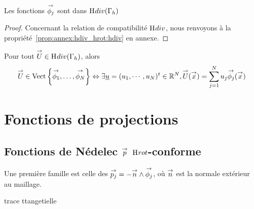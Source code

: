     \begin{prop}
      Les fonctions \(\phij\) sont dans \(\Hdiv(\Gamma_h)\)
    \end{prop}
    \begin{proof}
      Concernant la relation de compatibilité \(\Hdiv\), nous renvoyons à la propriété~\ref{prop:annex:hdiv_hrot:hdiv} en annexe.
    \end{proof}

    \begin{defn}
      Pour tout \(\vect{U} \in \Hdiv(\Gamma_h)\), alors
      \begin{equation*}
        \vect{U} \in \Vect{\vect{\phi_1},\ldots,\vect{\phi_N}} \Leftrightarrow \exists \comp{u} = (u_1,\cdots,u_N)^t \in \RR^N, \vect{U}(\vx) = \sum_{j=1}^N u_j \phij(\vx)
      \end{equation*}
    \end{defn}

\section{Fonctions de projections}


  \subsection[Fonctions de Nédélec p Hrot-conforme]{Fonctions de Nédelec \(\vect{p}\) \(\Hrot\)-conforme}

    Une première famille est celle des \(\pj=-\vn\pvect\phij\), où \(\vn\) est la normale extérieur au maillage. 
    \begin{TODO} trace ttangetielle \end{TODO}


